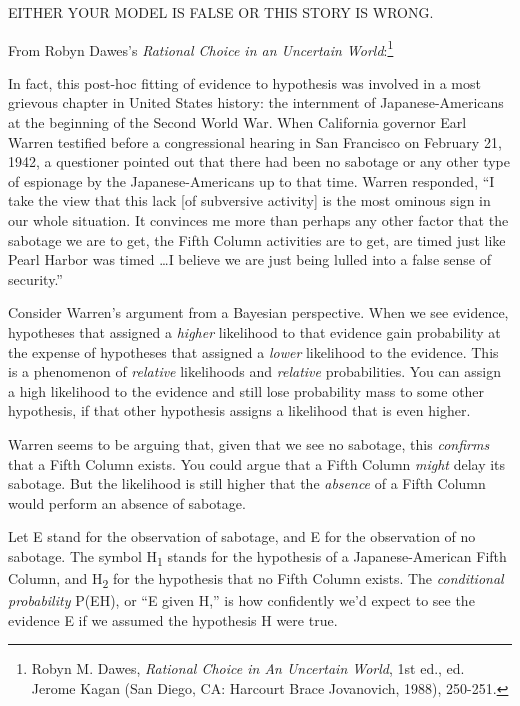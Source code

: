 {
 EITHER YOUR MODEL IS FALSE OR THIS STORY IS WRONG.}

\myendsectiontext


\bigskip


{
 From Robyn Dawes's \textit{Rational Choice in an
Uncertain World}:\footnote{Robyn M. Dawes, \textit{Rational Choice in An Uncertain World},
1st ed., ed. Jerome Kagan (San Diego, CA: Harcourt Brace Jovanovich,
1988), 250-251.}}

{
 In fact, this post-hoc fitting of evidence to hypothesis was
involved in a most grievous chapter in United States history: the
internment of Japanese-Americans at the beginning of the Second World
War. When California governor Earl Warren testified before a
congressional hearing in San Francisco on February 21, 1942, a
questioner pointed out that there had been no sabotage or any other
type of espionage by the Japanese-Americans up to that time. Warren
responded, ``I take the view that this lack [of
subversive activity] is the most ominous sign in our whole situation.
It convinces me more than perhaps any other factor that the sabotage we
are to get, the Fifth Column activities are to get, are timed just like
Pearl Harbor was timed \ldots I believe we are just being lulled into a
false sense of security.''}

{
 Consider Warren's argument from a Bayesian
perspective. When we see evidence, hypotheses that assigned a
\textit{higher} likelihood to that evidence gain probability at the
expense of hypotheses that assigned a \textit{lower} likelihood to the
evidence. This is a phenomenon of \textit{relative} likelihoods and
\textit{relative} probabilities. You can assign a high likelihood to
the evidence and still lose probability mass to some other hypothesis,
if that other hypothesis assigns a likelihood that is even higher.}

{
 Warren seems to be arguing that, given that we see no sabotage,
this \textit{confirms} that a Fifth Column exists. You could argue that
a Fifth Column \textit{might} delay its sabotage. But the likelihood is
still higher that the \textit{absence} of a Fifth Column would perform
an absence of sabotage.}

{
 Let E stand for the observation of sabotage, and {\textlnot}E for
the observation of no sabotage. The symbol H\textsubscript{1} stands
for the hypothesis of a Japanese-American Fifth Column, and
H\textsubscript{2} for the hypothesis that no Fifth Column exists. The
\textit{conditional probability} P(E{\textbar}H), or
``E given H,'' is how confidently
we'd expect to see the evidence E if we assumed the
hypothesis H were true.}

